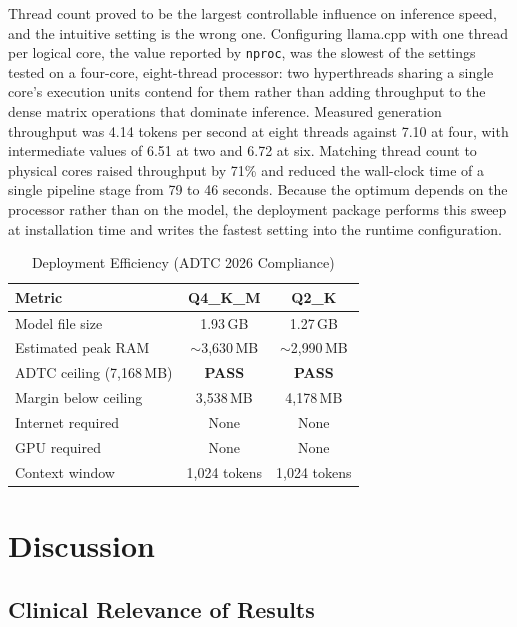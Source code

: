 \documentclass[conference]{IEEEtran}
\begin{document}
Thread count proved to be the largest controllable influence on
inference speed, and the intuitive setting is the wrong one.
Configuring llama.cpp with one thread per logical core, the value
reported by \texttt{nproc}, was the slowest of the settings tested on a
four-core, eight-thread processor: two hyperthreads sharing a single
core's execution units contend for them rather than adding throughput
to the dense matrix operations that dominate inference. Measured
generation throughput was 4.14 tokens per second at eight threads
against 7.10 at four, with intermediate values of 6.51 at two and 6.72
at six. Matching thread count to physical cores raised throughput by
71\% and reduced the wall-clock time of a single pipeline stage from 79
to 46 seconds. Because the optimum depends on the processor rather than
on the model, the deployment package performs this sweep at
installation time and writes the fastest setting into the runtime
configuration.

\begin{table}[h!]
\centering
\caption{Deployment Efficiency (ADTC 2026 Compliance)}
\label{tab:efficiency}
\begin{tabular}{lcc}
\toprule
\textbf{Metric} & \textbf{Q4\_K\_M} & \textbf{Q2\_K} \\
\midrule
Model file size           & 1.93\,GB & 1.27\,GB \\
Estimated peak RAM        & $\sim$3{,}630\,MB & $\sim$2{,}990\,MB \\
ADTC ceiling (7{,}168\,MB)& \textbf{PASS} & \textbf{PASS} \\
Margin below ceiling      & 3{,}538\,MB & 4{,}178\,MB \\
Internet required         & None & None \\
GPU required              & None & None \\
Context window            & 1{,}024 tokens & 1{,}024 tokens \\
\bottomrule
\end{tabular}
\end{table}

\section{Discussion}
\label{sec:discussion}

\subsection{Clinical Relevance of Results}
\end{document}
